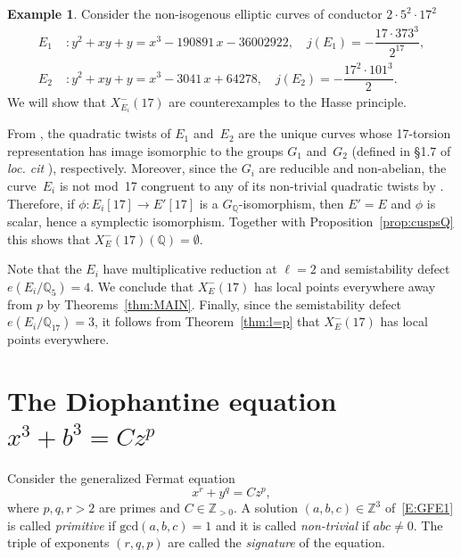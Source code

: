 \documentclass[12pt]{amsart}
\numberwithin{equation}{section}
\theoremstyle{definition}
\newtheorem{example}[equation]{Example}
\renewcommand{\gcd}{\text{gcd}}
\newcommand{\Q}{\mathbb{Q}}
\newcommand{\Z}{\mathbb{Z}}
\begin{document}
\begin{example} \label{ex:final}
Consider the non-isogenous elliptic curves of conductor $2 \cdot 5^2 \cdot 17^2$
 \begin{align*}
E_1 &\; \colon y^2 + xy + y = x^3 - 190891\,x - 36002922,
  \quad j(E_1) = -\dfrac{17\cdot 373^3}{2^{17}}, \\[1em]
E_2 &\; \colon y^2 + xy + y = x^3 - 3041\,x + 64278,  
 \quad  j(E_2) = -\dfrac{17^2\cdot 101^3}{2}.
\end{align*}   
We will show that $X_{E_i}^{-}(17)$ are counterexamples to the Hasse principle.

From \cite[Theorem~1.10]{Zywina2015}, the quadratic twists of $E_1$ and~$E_2$ are the unique curves whose 17-torsion representation has image isomorphic to
the groups $G_1$ and~$G_2$ (defined in \S1.7 of {\it loc. cit }), respectively. Moreover, since the $G_i$ are reducible and non-abelian, the curve~$E_i$ is not mod~17 congruent to any of its non-trivial quadratic twists by \cite[Lemma~2.3]{CremonaFreitas}. 
Therefore, if $\phi : E_i[17] \to E'[17]$ is a $G_\Q$-isomorphism, then $E' = E$ and $\phi$ is scalar, hence a symplectic isomorphism.  Together with Proposition~\ref{prop:cuspsQ} this shows that $X_E^-(17)(\Q) = \emptyset$.

Note that the $E_i$ have multiplicative reduction at $\ell=2$ and
semistability defect $e(E_i/\Q_5)=4$. We conclude that $X_E^{-}(17)$ has local points everywhere away from $p$ by Theorems~\ref{thm:MAIN}. Finally, since the semistability defect $e(E_i/\Q_{17})=3$, it follows from Theorem~\ref{thm:l=p} that $X_E^{-}(17)$ has local points everywhere.
\end{example}
\vspace{-2mm}
\section{The Diophantine equation \texorpdfstring{$x^3+b^3=Cz^p$}{x³+b³=Czᵖ}}\label{sec:33p}

Consider the generalized Fermat equation
\begin{equation} \label{E:GFE1}
  x^r + y^q =Cz^p,
\end{equation}
where $p,q,r > 2$ are primes and $C\in \Z_{>0}$.
A solution $(a,b,c) \in \Z^3$ of~\eqref{E:GFE1} is called {\it primitive} if $\gcd(a,b,c)=1$ and it is called {\it non-trivial} if $abc \neq 0$. The triple of exponents $(r,q,p)$ are called the {\it signature} of the equation.
\end{document}
